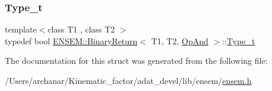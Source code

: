 \mbox{\label{structENSEM_1_1BinaryReturn_3_01T1_00_01T2_00_01OpAnd_01_4_a1efceffe0a3869bf85b2fa8d9b578978}} 
\subsubsection{\texorpdfstring{Type\_t}{Type\_t}\hspace{0.1cm}{\footnotesize\ttfamily [2/2]}}
{\footnotesize\ttfamily template$<$class T1 , class T2 $>$ \\
typedef bool \mbox{\hyperlink{structENSEM_1_1BinaryReturn}{E\+N\+S\+E\+M\+::\+Binary\+Return}}$<$ T1, T2, \mbox{\hyperlink{structENSEM_1_1OpAnd}{Op\+And}} $>$\+::\mbox{\hyperlink{structENSEM_1_1BinaryReturn_3_01T1_00_01T2_00_01OpAnd_01_4_a1efceffe0a3869bf85b2fa8d9b578978}{Type\+\_\+t}}}



The documentation for this struct was generated from the following file\+:\begin{DoxyCompactItemize}
\item 
/\+Users/archanar/\+Kinematic\+\_\+factor/adat\+\_\+devel/lib/ensem/\mbox{\hyperlink{lib_2ensem_2ensem_8h}{ensem.\+h}}\end{DoxyCompactItemize}
